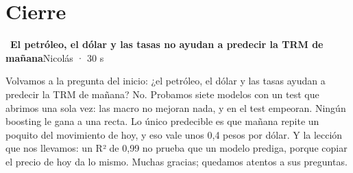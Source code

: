 \documentclass[11pt,letterpaper]{article}
\newcommand{\diapo}[4]{\par\bigskip{\color{oro}\textbf{#1.}}~\textbf{#2}\hfill{\small #3 · #4}\par\nopagebreak\smallskip}
\begin{document}
\section*{Cierre}
\diapo{17}{El petróleo, el dólar y las tasas no ayudan a predecir la TRM de mañana}{Nicolás}{30 s}
Volvamos a la pregunta del inicio: ¿el petróleo, el dólar y las tasas ayudan a predecir la TRM de mañana? No. Probamos siete modelos con un test que abrimos una sola vez: las macro no mejoran nada, y en el test empeoran. Ningún boosting le gana a una recta. Lo único predecible es que mañana repite un poquito del movimiento de hoy, y eso vale unos 0,4 pesos por dólar. Y la lección que nos llevamos: un R² de 0,99 no prueba que un modelo prediga, porque copiar el precio de hoy da lo mismo. Muchas gracias; quedamos atentos a sus preguntas.


\newpage
\end{document}
